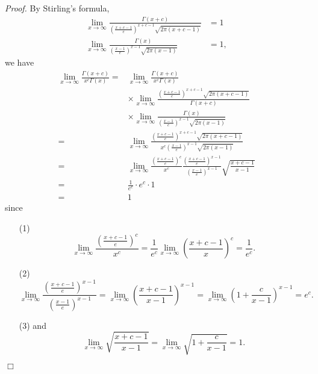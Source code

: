 \documentclass{article}
\begin{document}
\emph{Proof.}
By Stirling's formula,
\begin{align*}
  \lim_{x \to \infty}
  \frac{\Gamma(x+c)}{\left( \frac{x+c-1}{e} \right)^{x+c-1} \sqrt{2\pi(x+c-1)}}
  &= 1 \\
  \lim_{x \to \infty}
  \frac{\Gamma(x)}{\left( \frac{x-1}{e} \right)^{x-1} \sqrt{2\pi(x-1)}}
  &= 1,
\end{align*}
we have
\begin{align*}
  \lim_{x \to \infty} \frac{\Gamma(x+c)}{x^c \Gamma(x)}
  =&
  \lim_{x \to \infty} \frac{\Gamma(x+c)}{x^c \Gamma(x)} \\
  &\times
  \lim_{x \to \infty}
  \frac{\left( \frac{x+c-1}{e} \right)^{x+c-1} \sqrt{2\pi(x+c-1)}}{\Gamma(x+c)} \\
  &\times
  \lim_{x \to \infty}
  \frac{\Gamma(x)}{\left( \frac{x-1}{e} \right)^{x-1} \sqrt{2\pi(x-1)}} \\
  =&
  \lim_{x \to \infty} \frac{\left( \frac{x+c-1}{e} \right)^{x+c-1} \sqrt{2\pi(x+c-1)}}
    {x^c \left( \frac{x-1}{e} \right)^{x-1} \sqrt{2\pi(x-1)}} \\
  =&
  \lim_{x \to \infty}
  \frac{\left( \frac{x+c-1}{e} \right)^{c}}{x^c}
  \frac{\left( \frac{x+c-1}{e} \right)^{x-1}}{\left( \frac{x-1}{e} \right)^{x-1}}
  \sqrt{\frac{x+c-1}{x-1}} \\
  =& \frac{1}{e^c} \cdot e^c \cdot 1 \\
  =& 1
\end{align*}
since
\begin{enumerate}
\item[(1)]
\[
  \lim_{x \to \infty}
    \frac{\left( \frac{x+c-1}{e} \right)^{c}}{x^c}
  = \frac{1}{e^c} \lim_{x \to \infty} \left( \frac{x+c-1}{x} \right)^{c}
  = \frac{1}{e^c}.
\]

\item[(2)]
\[
  \lim_{x \to \infty}
    \frac{\left( \frac{x+c-1}{e} \right)^{x-1}}{\left( \frac{x-1}{e} \right)^{x-1}}
  = \lim_{x \to \infty} \left( \frac{x+c-1}{x-1} \right)^{x-1}
  = \lim_{x \to \infty} \left( 1+\frac{c}{x-1} \right)^{x-1}
  = e^c.
\]

\item[(3)]
and
\[
  \lim_{x \to \infty} \sqrt{\frac{x+c-1}{x-1}}
  = \lim_{x \to \infty} \sqrt{1+\frac{c}{x-1}} = 1.
\]
\end{enumerate}
$\Box$ \\\\



\end{document}
